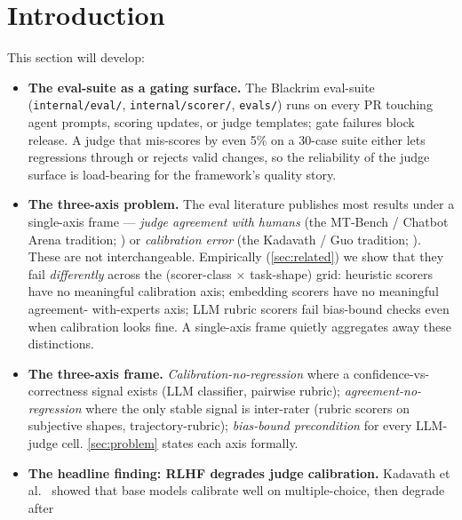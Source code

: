 \section{Introduction}
\label{sec:intro}


This section will develop:

\begin{itemize}[leftmargin=*]
  \item \textbf{The eval-suite as a gating surface.} The Blackrim eval-suite
        (\texttt{internal/eval/}, \texttt{internal/scorer/}, \texttt{evals/})
        runs on every PR touching agent prompts, scoring updates, or judge
        templates; gate failures block release. A judge that mis-scores by
        even 5\% on a 30-case suite either lets regressions through or
        rejects valid changes, so the reliability of the judge surface is
        load-bearing for the framework's quality story.
  \item \textbf{The three-axis problem.} The eval literature publishes most
        results under a single-axis frame --- \emph{judge agreement with
        humans} (the MT-Bench / Chatbot Arena tradition;
        \cite{zheng2023judging}) or \emph{calibration error} (the
        Kadavath / Guo tradition; \cite{kadavath2022language,guo2017calibration}).
        These are not interchangeable. Empirically (\cref{sec:related}) we
        show that they fail \emph{differently} across the (scorer-class
        $\times$ task-shape) grid: heuristic scorers have no meaningful
        calibration axis; embedding scorers have no meaningful agreement-
        with-experts axis; LLM rubric scorers fail bias-bound checks even
        when calibration looks fine. A single-axis frame quietly aggregates
        away these distinctions.
  \item \textbf{The three-axis frame.} \emph{Calibration-no-regression} where
        a confidence-vs-correctness signal exists (LLM classifier, pairwise
        rubric); \emph{agreement-no-regression} where the only stable signal
        is inter-rater (rubric scorers on subjective shapes,
        trajectory-rubric); \emph{bias-bound precondition} for every
        LLM-judge cell. \cref{sec:problem} states each axis formally.
  \item \textbf{The headline finding: RLHF degrades judge calibration.}
        Kadavath et al.\ \cite{kadavath2022language} showed that base
        models calibrate well on multiple-choice, then degrade after

\end{itemize}
